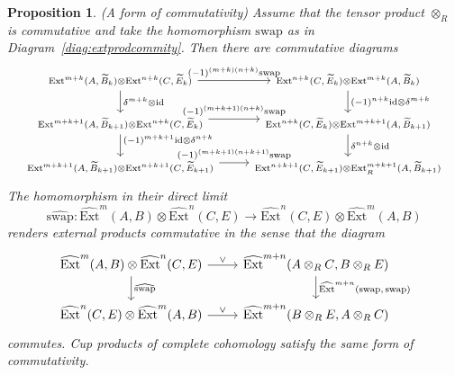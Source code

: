 \documentclass[12pt, a4paper]{article}
\numberwithin{equation}{section}
\newtheorem{prop}[thm]{Proposition}
\theoremstyle{empty}
\theoremstyle{nonumberplain}
\begin{document}
\begin{prop}\label{prop:extprodsgradedcomm}
(A form of commutativity)\newline
Assume that the tensor product $\otimes_R$ is commutative and take the homomorphism $\mathrm{swap}$ as in Diagram~\ref{diag:extprodcommity}. Then there are commutative diagrams
\begin{equation}\label{diag:swapdirlim}
\begin{tikzcd}
    {\scriptstyle \mathrm{Ext}^{m+k}(A{,} \, \widetilde{B}_k) \otimes \mathrm{Ext}^{n+k}(C{,} \, \widetilde{E}_k)} \arrow[r, "{\scriptstyle (-1)^{(m+k)(n+k)} \mathrm{swap}}"] \arrow[d, "{\scriptstyle \delta^{m+k} \otimes \mathrm{id}}"] & {\scriptstyle \mathrm{Ext}^{n+k}(C{,} \, \widetilde{E}_k) \otimes \mathrm{Ext}^{m+k}(A{,} \, \widetilde{B}_k)} \arrow[d, "{\scriptstyle (-1)^{n+k} \mathrm{id} \otimes \delta^{m+k}}"] \\
    {\scriptstyle \mathrm{Ext}^{m+k+1}(A{,} \, \widetilde{B}_{k+1}) \otimes \mathrm{Ext}^{n+k}(C{,} \, \widetilde{E}_k)} \arrow[r, shift left = 4pt, "{\scriptstyle (-1)^{(m+k+1)(n+k)} \mathrm{swap}}"] \arrow[d, "{\scriptstyle (-1)^{m+k+1} \mathrm{id} \otimes \delta^{n+k}}" near start] & {\scriptstyle \mathrm{Ext}^{n+k}(C{,} \, \widetilde{E}_k) \otimes \mathrm{Ext}^{m+k+1}(A{,} \, \widetilde{B}_{k+1})} \arrow[d, "{\scriptstyle \delta^{n+k} \otimes \mathrm{id}}"] \\
    {\scriptstyle \mathrm{Ext}^{m+k+1}(A{,} \, \widetilde{B}_{k+1}) \otimes \mathrm{Ext}^{n+k+1}(C{,} \, \widetilde{E}_{k+1})} \arrow[r, shift left = 4pt, "{\scriptstyle (-1)^{(m+k+1)(n+k+1)} \mathrm{swap}}"] & {\scriptstyle \mathrm{Ext}^{n+k+1}(C{,} \, \widetilde{E}_{k+1}) \otimes \mathrm{Ext}_R^{m+k+1}(A{,} \, \widetilde{B}_{k+1})}
\end{tikzcd}
\end{equation}
The homomorphism in their direct limit
\[ \widehat{\mathrm{swap}}: \widehat{\mathrm{Ext}}^m(A, B) \otimes \widehat{\mathrm{Ext}}^n(C, E) \rightarrow \widehat{\mathrm{Ext}}^n(C, E) \otimes \widehat{\mathrm{Ext}}^m(A, B) \]
renders external products commutative in the sense that the diagram
\begin{equation}\label{diag:fakecommity}
\begin{tikzcd}
    \widehat{\mathrm{Ext}}^m(A{,} \, B) \otimes \widehat{\mathrm{Ext}}^n(C{,} \, E) \arrow[r, "\vee"] \arrow[d, "\widehat{\mathrm{swap}}"] & \widehat{\mathrm{Ext}}^{m+n}(A \otimes_R C{,} \, B \otimes_R E) \arrow[d, "\widehat{\mathrm{Ext}}^{m+n}(\mathrm{swap}{,} \, \mathrm{swap})"] \\
    \widehat{\mathrm{Ext}}^n(C{,} \, E) \otimes \widehat{\mathrm{Ext}}^m(A{,} \, B) \arrow[r, "\vee"] & \widehat{\mathrm{Ext}}^{m+n}(B \otimes_R E{,} \, A \otimes_R C)
\end{tikzcd}
\end{equation}
commutes. Cup products of complete cohomology satisfy the same form of commutativity.
\end{prop}
\end{document}
